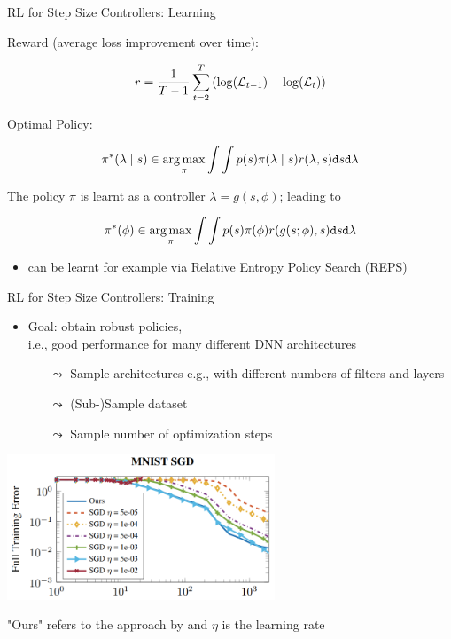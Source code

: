 \begin{frame}[c]{RL for Step Size Controllers: Learning }

Reward (average loss improvement over time):

$$r = \frac{1}{T-1} \sum_{t=2}^T \left(\log(\mathcal{L}_{t-1}) - \log(\mathcal{L}_t)\right)$$

\pause

Optimal Policy:

$$\pi^*(\lambda \mid s) \in \operatorname*{arg\,max}_{\pi} \int \int p(s) \pi(\lambda\mid s)r(\lambda,s) \texttt{d}s \texttt{d}\lambda $$

\pause

The policy $\pi$ is learnt as a controller $\lambda = g(s, \phi)$; leading to

$$\pi^*(\phi) \in \operatorname*{arg\,max}_{\pi} \int \int p(s) \pi(\phi)r(g(s;\phi),s) \texttt{d}s \texttt{d}\lambda $$

\pause

\begin{itemize}
\item can be learnt for example via Relative Entropy Policy Search (REPS) 
\end{itemize}

\end{frame}
\begin{frame}[c]{RL for Step Size Controllers: Training }

\begin{itemize}
\item Goal: obtain robust policies,\\ i.e., good performance for many different DNN architectures
\begin{itemize}
\item[$\leadsto$] Sample architectures e.g., with different numbers of filters and layers
\item[$\leadsto$] (Sub-)Sample dataset
\item[$\leadsto$] Sample number of optimization steps
\end{itemize}
\end{itemize}

\pause 
\medskip
\centering
\includegraphics[width=0.6\textwidth]{images/l2stepsizecontroler_mnist_training.png}

"Ours" refers to the approach by  and $\eta$ is the learning rate

\end{frame}
